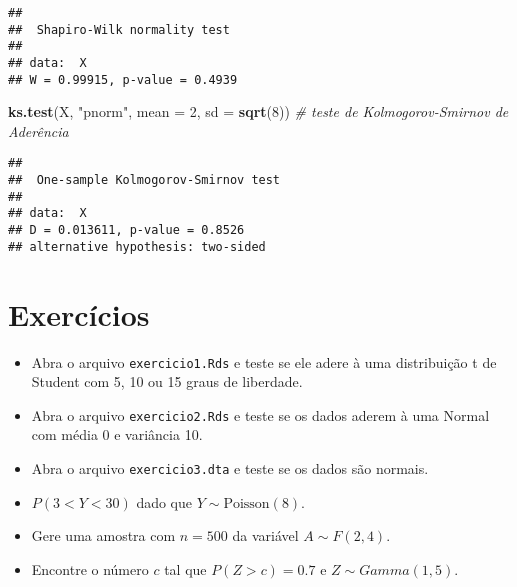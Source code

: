 \documentclass[
]{article}
\newenvironment{Shaded}{\begin{snugshade}}{\end{snugshade}}
\newcommand{\CommentTok}[1]{\textcolor[rgb]{0.56,0.35,0.01}{\textit{#1}}}
\newcommand{\DataTypeTok}[1]{\textcolor[rgb]{0.13,0.29,0.53}{#1}}
\newcommand{\DecValTok}[1]{\textcolor[rgb]{0.00,0.00,0.81}{#1}}
\newcommand{\KeywordTok}[1]{\textcolor[rgb]{0.13,0.29,0.53}{\textbf{#1}}}
\newcommand{\NormalTok}[1]{#1}
\newcommand{\StringTok}[1]{\textcolor[rgb]{0.31,0.60,0.02}{#1}}
\providecommand{\tightlist}{%
  \setlength{\itemsep}{0pt}\setlength{\parskip}{0pt}}
\begin{document}
\begin{verbatim}
## 
##  Shapiro-Wilk normality test
## 
## data:  X
## W = 0.99915, p-value = 0.4939
\end{verbatim}

\begin{Shaded}
\begin{Highlighting}[]
\KeywordTok{ks.test}\NormalTok{(X, }
        \StringTok{"pnorm"}\NormalTok{, }
        \DataTypeTok{mean =} \DecValTok{2}\NormalTok{, }
        \DataTypeTok{sd =} \KeywordTok{sqrt}\NormalTok{(}\DecValTok{8}\NormalTok{)) }\CommentTok{# teste de Kolmogorov-Smirnov de Aderência}
\end{Highlighting}
\end{Shaded}

\begin{verbatim}
## 
##  One-sample Kolmogorov-Smirnov test
## 
## data:  X
## D = 0.013611, p-value = 0.8526
## alternative hypothesis: two-sided
\end{verbatim}

\hypertarget{exercuxedcios}{%
\section{Exercícios}\label{exercuxedcios}}

\begin{itemize}
\tightlist
\item
  Abra o arquivo \texttt{exercicio1.Rds} e teste se ele adere à uma
  distribuição t de Student com 5, 10 ou 15 graus de liberdade.
\item
  Abra o arquivo \texttt{exercicio2.Rds} e teste se os dados aderem à
  uma Normal com média 0 e variância 10.
\item
  Abra o arquivo \texttt{exercicio3.dta} e teste se os dados são
  normais.
\item
  \(P(3 < Y < 30)\) dado que \(Y \sim \text{Poisson}(8)\).
\item
  Gere uma amostra com \(n=500\) da variável \(A \sim F(2, 4)\).
\item
  Encontre o número \(c\) tal que \(P(Z>c) = 0.7\) e
  \(Z \sim Gamma(1, 5)\).
\end{itemize}
\end{document}
